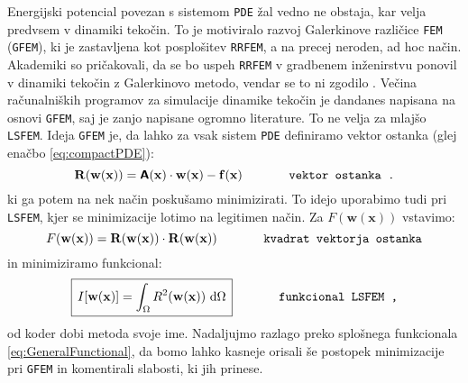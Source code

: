 Energijski potencial povezan s sistemom \texttt{PDE} žal vedno ne obstaja, kar velja predvsem v dinamiki tekočin. To je motiviralo razvoj Galerkinove različice \texttt{FEM} (\texttt{GFEM}), ki je zastavljena kot posplošitev \texttt{RRFEM}, a na precej neroden, ad hoc način. Akademiki so pričakovali, da se bo uspeh \texttt{RRFEM} v gradbenem inženirstvu ponovil v dinamiki tekočin z Galerkinovo metodo, vendar se to ni zgodilo \cite{JiangB-LSFEM}. Večina računalniških programov za simulacije dinamike tekočin je dandanes napisana na osnovi \texttt{GFEM}, saj je zanjo napisane ogromno literature. To ne velja za mlajšo \texttt{LSFEM}. Ideja \texttt{GFEM} je, da lahko za vsak sistem \texttt{PDE} definiramo vektor ostanka (glej enačbo \eqref{eq:compactPDE}):
\begin{equation}
	\mathbf{R(w(x))} = \bm{\mathsf{A}}(\mathbf{x}) \cdot \mathbf{w(x)} - \mathbf{f(x)} \hspace{1.3cm} \texttt{vektor ostanka .}
	\label{eq:residual}
\end{equation}
ki ga potem na nek način poskušamo minimizirati. To idejo uporabimo tudi pri \texttt{LSFEM}, kjer se minimizacije lotimo na legitimen način. Za $F(\mathbf{w(x)})$ vstavimo:
\begin{equation}
	F(\mathbf{w(x)}) = \mathbf{R(w(x))} \cdot \mathbf{R(w(x))} \hspace{1.3cm} \texttt{kvadrat vektorja ostanka}
\end{equation}
in minimiziramo funkcional:
\begin{equation}
	\boxed{\, I[\mathbf{w(x)}] = \int_{\Omega} R^2(\mathbf{w(x)}) \ \mathrm{d} \Omega \,} \hspace{1.3cm} \texttt{funkcional LSFEM ,}
\end{equation}
od koder dobi metoda svoje ime. Nadaljuj\-mo razlago preko splošnega funkcionala \eqref{eq:GeneralFunctional}, da bomo lahko kasneje orisali še postopek minimizacije pri \texttt{GFEM} in komentirali slabosti, ki jih prinese.

